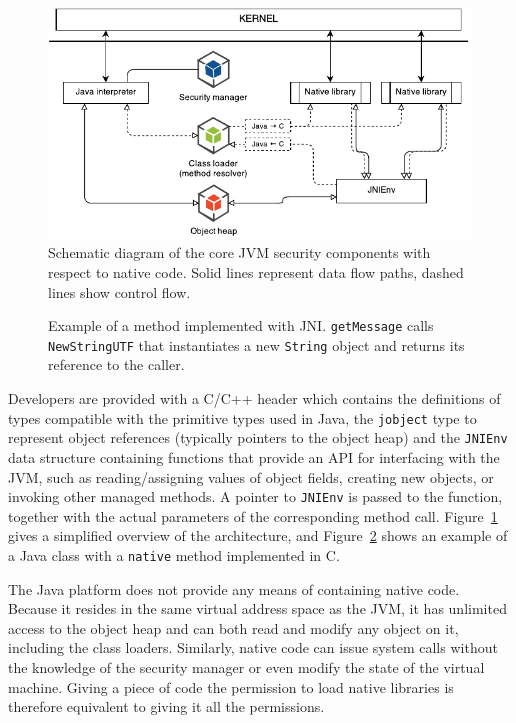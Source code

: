 \documentclass[a4paper,12pt,twoside,openright]{report}
\begin{document}
\begin{figure}
	\includegraphics[width=\textwidth]{dia_jni_orig.pdf}
	\caption{Schematic diagram of the core JVM security components with respect to native code. Solid lines represent data flow paths, dashed lines show control flow.}
	\label{fig:OverviewJNI}
\end{figure}

\begin{figure}[t]
	
	
	\caption{Example of a method implemented with JNI. \texttt{getMessage} calls \texttt{NewStringUTF} that instantiates a new \texttt{String} object and returns its reference to the caller.}
	\label{listing:HelloJNI}
\end{figure}

Developers are provided with a C/C++ header which contains the definitions of types compatible with the primitive types used in Java, the \texttt{jobject} type to represent object references (typically pointers to the object heap) and the \texttt{JNIEnv} data structure containing functions that provide an API for interfacing with the JVM, such as reading/assigning values of object fields, creating new objects, or invoking other managed methods. A pointer to \texttt{JNIEnv} is passed to the function, together with the actual parameters of the corresponding method call. Figure~\ref{fig:OverviewJNI} gives a simplified overview of the architecture, and Figure~\ref{listing:HelloJNI} shows an example of a Java class with a \texttt{native} method implemented in C.

The Java platform does not provide any means of containing native code. Because it resides in the same virtual address space as the JVM, it has unlimited access to the object heap and can both read and modify any object on it, including the class loaders. Similarly, native code can issue system calls without the knowledge of the security manager or even modify the state of the virtual machine. Giving a piece of code the permission to load native libraries is therefore equivalent to giving it all the permissions.
\end{document}
